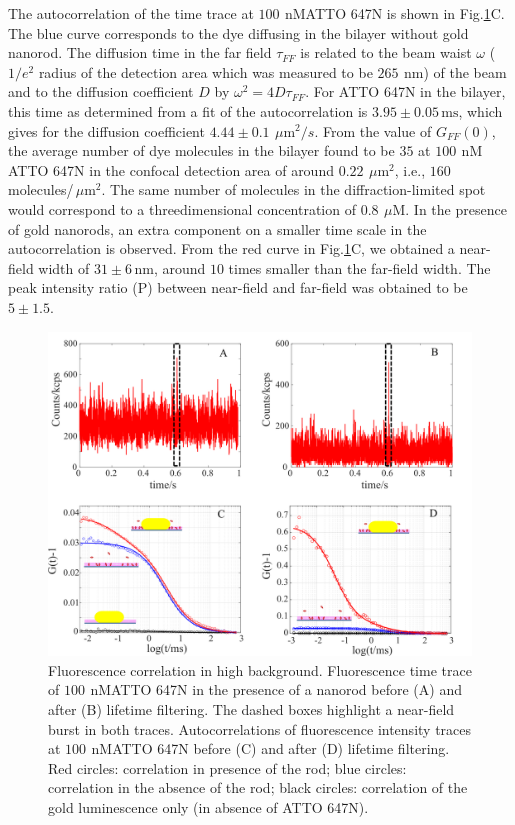 \documentclass[journal=jacsat,manuscript=article]{achemso}
\newcommand{\nm}{\ensuremath{\,\textrm{nm}}}
\newcommand{\um}{\ensuremath{\,\mu\textrm{m}}}
\newcommand{\uM}{\ensuremath{\,\mu\textrm{M}}}
\newcommand{\nM}{\ensuremath{\,\textrm{nM}}}
\newcommand{\ms}{\ensuremath{\,\textrm{ms}}}
\begin{document}
The autocorrelation of the time trace at $100~$\nM ATTO 647N is shown in Fig.\ref{fig:corr_enhnc}C. The blue curve corresponds to the dye diffusing in the bilayer without gold nanorod. The diffusion time in the far field $\tau_{FF}$ is related to the beam waist $\omega$ ($1/e^2$ radius of the detection area which was measured to be $265~$\nm) of the beam and to the diffusion coefficient $D$ by $\omega^2=4D\tau_{FF}$. For ATTO 647N in the bilayer, this time as determined from a fit of the autocorrelation is $3.95\pm0.05$\ms, which gives for the diffusion coefficient $4.44\pm0.1~\um^2/s$. From the value of $G_{FF}(0)$, the average number of dye molecules in the bilayer found to be $35$ at $100~$\nM ATTO 647N in the confocal detection area of around $0.22~\um^2$, i.e., $160$ molecules/$\um^2$. The same number of molecules in the diffraction-limited spot would correspond to a threedimensional concentration of $0.8~$\uM. In the presence of gold nanorods, an extra component on a smaller time scale in the autocorrelation is observed. From the red curve in Fig.\ref{fig:corr_enhnc}C, we obtained a near-field width of $31\pm6\nm$, around $10$ times smaller than the far-field width. The peak intensity ratio (P) between near-field and far-field was obtained to be $5\pm1.5$.
\begin{figure}
	\centering
	\includegraphics[]{corr_enhnc.png}
	\caption{Fluorescence correlation in high background. Fluorescence time trace of $100~$\nM ATTO 647N in the presence of a nanorod before (A) and after (B) lifetime filtering. The dashed boxes highlight a near-field burst in both traces. Autocorrelations of fluorescence intensity traces at $100~$\nM ATTO 647N before (C) and after (D) lifetime filtering. Red circles: correlation in presence of the rod; blue circles: correlation in the absence of the rod; black circles: correlation of the gold luminescence only (in absence of ATTO 647N).}
	\label{fig:corr_enhnc}
\end{figure}
\end{document}
